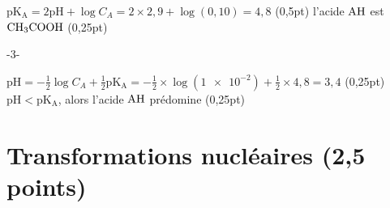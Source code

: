\documentclass[12pt,national]{teaching}
\newlength\cwi
\newlength\cwii
\newlength\cwiii
\begin{document}
\begin{tcbitemize}
\begin{tcbitemize}
                     $\mathrm{pK_A}=2\mathrm{pH}+\log C_A=
                     2\times 2,9+\log(0,10)=4,8$
            \tcbitem (0,5pt)
            \tcbitem l'acide $\ce{AH}$ est $\ce{CH3COOH}$
            \tcbitem (0,25pt)
        \end{tcbitemize}
    -3-
    \tcbitem[raster multicolumn=2,raster multirow=2,blankest]
        \begin{tcbitemize}[raster rows=2,raster columns=2,
               raster height=\tcbtextheight,
               raster column 1/.style={width=\cwii},
               raster column 2/.style={width=\cwiii,fontupper=\bfseries}
            ]
            \tcbitem $\mathrm{pH}=-\frac12\log C_A+\frac12\mathrm{pK_A}=
                     -\frac12\times\log(\num{1e-2})+\frac12\times 4,8=3,4$
            \tcbitem (0,25pt)
            \tcbitem $\mathrm{pH}<\mathrm{pK_A}$, \;
                     alors l'acide $\ce{AH}$ prédomine
            \tcbitem (0,25pt)
        \end{tcbitemize}
\end{tcbitemize}

\section{Transformations nucléaires (2,5 points)}
\end{document}
